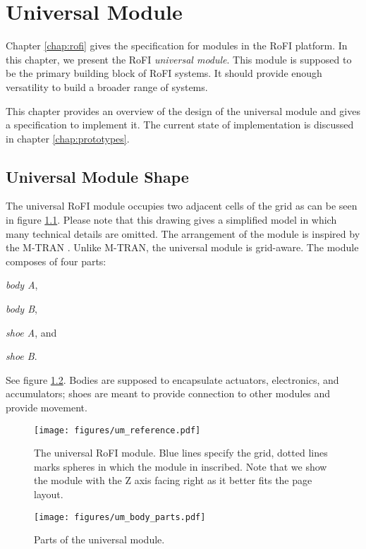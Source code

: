 \chapter{Universal Module}\label{chap:universal_module}

Chapter \ref{chap:rofi} gives the specification for modules in the RoFI
platform. In this chapter, we present the RoFI \emph{universal module}. This
module is supposed to be the primary building block of RoFI systems. It should
provide enough versatility to build a broader range of systems.

This chapter provides an overview of the design of the universal module and
gives a specification to implement it. The current state of implementation is
discussed in chapter \ref{chap:prototypes}.

\section{Universal Module Shape}

The universal RoFI module occupies two adjacent cells of the grid as can be seen
in figure \ref{fig:um_reference}. Please note that this drawing gives a
simplified model in which many technical details are omitted. The arrangement of
the module is inspired by the M-TRAN \cite{kurokawa_distributed_2008}. Unlike
M-TRAN, the universal module is grid-aware. The module composes of four parts:
\begin{enumerate*}
    \item \emph{body A},
    \item \emph{body B},
    \item \emph{shoe A}, and
    \item \emph{shoe B}.
\end{enumerate*}
See figure \ref{fig:um_body_parts}. Bodies are supposed to encapsulate
actuators, electronics, and accumulators; shoes are meant to provide connection
to other modules and provide movement.

\begin{figure}[t]
    \centering
    \texttt{[image: figures/um\_reference.pdf]}
    \caption{The universal RoFI module. Blue lines specify the grid, dotted
    lines marks spheres in which the module in inscribed. Note that we show the
    module with the Z axis facing right as it better fits  the page layout. }
    \label{fig:um_reference}
\end{figure}

\begin{figure}[t]
    \centering
    \texttt{[image: figures/um\_body\_parts.pdf]}
    \caption{Parts of the universal module.}
    \label{fig:um_body_parts}
\end{figure}

